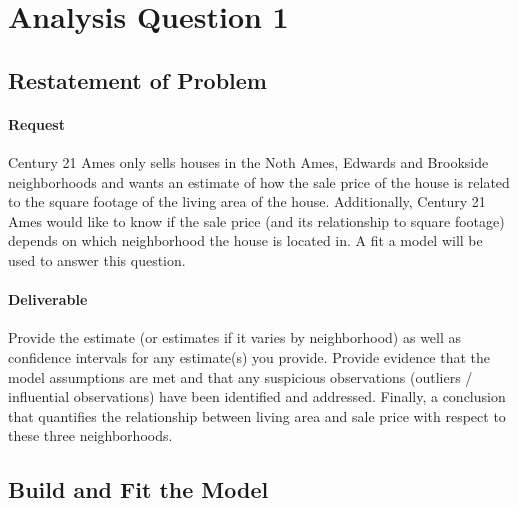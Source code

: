 \documentclass[11pt]{scrartcl} %
\begin{document}

\section{Analysis Question 1}
\subsection{Restatement of Problem}
\paragraph{Request} Century 21 Ames only sells houses in the Noth Ames, Edwards and Brookside neighborhoods and wants an estimate of how the sale price of the house is related to the square footage of the living area of the house. Additionally, Century 21 Ames would like to know if the sale price (and its relationship to square footage) depends on which neighborhood the house is located in. A fit a model will be used to answer this question.
\paragraph{Deliverable} Provide the estimate (or estimates if it varies by neighborhood) as well as confidence intervals for any estimate(s) you provide. Provide evidence that the model assumptions are met and that any suspicious observations (outliers / influential observations) have been identified and addressed. Finally, a conclusion that quantifies the relationship between living area and sale price with respect to these three neighborhoods.
\subsection{Build and Fit the Model}
\end{document}
